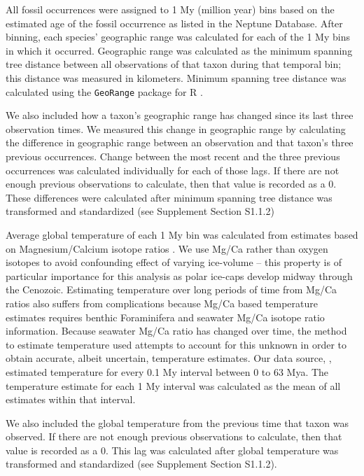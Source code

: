 \documentclass[12pt,letterpaper]{article}
\begin{document}
\begin{refsection}
All fossil occurrences were assigned to 1 My (million year) bins based on the estimated age of the fossil occurrence as listed in the Neptune Database. After binning, each species' geographic range was calculated for each of the 1 My bins in which it occurred. Geographic range was calculated as the minimum spanning tree distance between all observations of that taxon during that temporal bin; this distance was measured in kilometers. Minimum spanning tree distance was calculated using the \texttt{GeoRange} package for R \citep{GeoRange}. 

We also included how a taxon's geographic range has changed since its last three observation times. We measured this change in geographic range by calculating the difference in geographic range between an observation and that taxon's three previous occurrences. Change between the most recent and the three previous occurrences was calculated individually for each of those lags. If there are not enough previous observations to calculate, then that value is recorded as a 0. These differences were calculated after minimum spanning tree distance was transformed and standardized (see Supplement Section S1.1.2)

Average global temperature of each 1 My bin was calculated from estimates based on Magnesium/Calcium isotope ratios \citet{Cramer2011}. We use Mg/Ca rather than oxygen isotopes to avoid confounding effect of varying ice-volume -- this property is of particular importance for this analysis as polar ice-caps develop midway through the Cenozoic. Estimating temperature over long periods of time from Mg/Ca ratios also suffers from complications because Mg/Ca based temperature estimates requires benthic Foraminifera and seawater Mg/Ca isotope ratio information. Because seawater Mg/Ca ratio has changed over time, the method to estimate temperature used \citet{Cramer2011} attempts to account for this unknown in order to obtain accurate, albeit uncertain, temperature estimates. Our data source, \citet{Cramer2011}, estimated temperature for every 0.1 My interval between 0 to 63 Mya. The temperature estimate for each 1 My interval was calculated as the mean of all estimates within that interval. 

We also included the global temperature from the previous time that taxon was observed. If there are not enough previous observations to calculate, then that value is recorded as a 0. This lag was calculated after global temperature was transformed and standardized (see Supplement Section S1.1.2).


\end{refsection}
\end{document}
